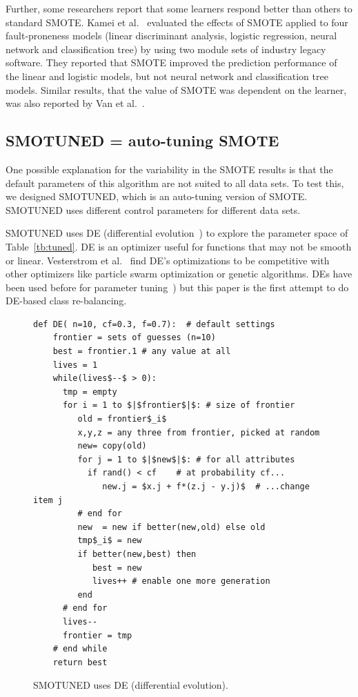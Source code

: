 \documentclass[sigconf,review, anonymous]{acmart}
\theoremstyle{break}
\theoremstyle{break}
\newcommand{\sma}{{\sc SMOTE}}
\newcommand{\smb}{{\sc SMOTUNED}}
\begin{document}
Further, some researchers report that some learners respond better than others to standard SMOTE. Kamei et al.~\cite{kamei2007effects} evaluated the effects of SMOTE applied to  four fault-proneness models
(linear discriminant analysis, logistic regression, neural network and classification tree) by
using two module sets of industry legacy software. They reported that SMOTE improved the prediction performance of the linear and logistic models, but not neural network and classification tree models. Similar results, that the value of SMOTE was dependent on the learner,
was also reported by Van et al.~\cite{van2007experimental}.

\subsection{SMOTUNED = auto-tuning SMOTE}
\label{sect:smotuned}

One possible explanation for the variability in the {\sma} results is that the
default parameters of this algorithm are not suited to all data sets. To test this,
we designed {\smb}, which is an auto-tuning version of {\sma}. {\smb}
uses different control parameters for different data sets.


 
{\smb} uses DE (differential evolution~\cite{storn1997differential}) to explore the parameter space of
Table~\ref{tb:tuned}.  DE is an
optimizer useful for functions that may not be smooth or linear.  Vesterstrom et al.~\cite{Vesterstrom04} find   DE's optimizations to be  competitive with other optimizers like 
   particle swarm optimization or genetic algorithms.
   DEs have been used before for   parameter tuning~\cite{omran2005differential, chiha2012tuning,fu2016tuning,fu2017easy, agrawal2016wrong}) but this paper is  the first attempt to do
   DE-based class re-balancing.

\begin{figure}[!b]\small
\begin{lstlisting}[mathescape,linewidth=8.2cm,frame=r,numbers=right]
  def DE( n=10, cf=0.3, f=0.7):  # default settings
    frontier = sets of guesses (n=10)
    best = frontier.1 # any value at all
    lives = 1
    while(lives$--$ > 0): 
      tmp = empty
      for i = 1 to $|$frontier$|$: # size of frontier
         old = frontier$_i$
         x,y,z = any three from frontier, picked at random
         new= copy(old)  
         for j = 1 to $|$new$|$: # for all attributes
           if rand() < cf    # at probability cf...
              new.j = $x.j + f*(z.j - y.j)$  # ...change item j
         # end for
         new  = new if better(new,old) else old
         tmp$_i$ = new 
         if better(new,best) then
            best = new
            lives++ # enable one more generation
         end                  
      # end for
      lives--
      frontier = tmp
    # end while
    return best
\end{lstlisting}
\caption{SMOTUNED uses DE (differential evolution).}
\label{fig:pseudo_DE} 
\end{figure}
\end{document}
